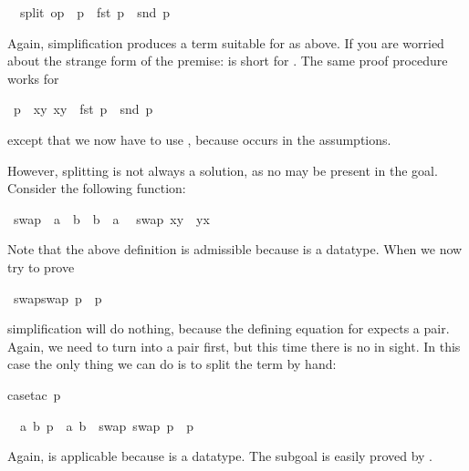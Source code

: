 \begin{isabellebody}
\begin{isamarkuptxt}
\begin{isabelle}%
\ {}{\isachardot}\ split\ op\ {\isacharequal}\ p\ {\isasymlongrightarrow}\ fst\ p\ {\isacharequal}\ snd\ p%
\end{isabelle}
Again, simplification produces a term suitable for 
as above. If you are worried about the strange form of the premise:
 is short for .
The same proof procedure works for%
\end{isamarkuptxt}%
\ {\isachardoublequote}p\ {\isasymin}\ {\isacharbraceleft}{\isacharparenleft}x{\isacharcomma}y{\isacharparenright}{\isachardot}\ x{\isacharequal}y{\isacharbraceright}\ {\isasymLongrightarrow}\ fst\ p\ {\isacharequal}\ snd\ p{\isachardoublequote}%
\begin{isamarkuptxt}%
\noindent
except that we now have to use , because
 occurs in the assumptions.

However, splitting  is not always a solution, as no 
may be present in the goal. Consider the following function:%
\end{isamarkuptxt}%
\ swap\ {\isacharcolon}{\isacharcolon}\ {\isachardoublequote}{\isacharprime}a\ {\isasymtimes}\ {\isacharprime}b\ {\isasymRightarrow}\ {\isacharprime}b\ {\isasymtimes}\ {\isacharprime}a{\isachardoublequote}\isanewline
{}\isanewline
\ \ {\isachardoublequote}swap\ {\isacharparenleft}x{\isacharcomma}y{\isacharparenright}\ {\isacharequal}\ {\isacharparenleft}y{\isacharcomma}x{\isacharparenright}{\isachardoublequote}%
\begin{isamarkuptext}%
\noindent
Note that the above  definition is admissible
because \isa{{\isasymtimes}} is a datatype. When we now try to prove%
\end{isamarkuptext}%
\ {\isachardoublequote}swap{\isacharparenleft}swap\ p{\isacharparenright}\ {\isacharequal}\ p{\isachardoublequote}%
\begin{isamarkuptxt}%
\noindent
simplification will do nothing, because the defining equation for 
expects a pair. Again, we need to turn  into a pair first, but this
time there is no  in sight. In this case the only thing we can do
is to split the term by hand:%
\end{isamarkuptxt}%
case{\isacharunderscore}tac\ p{\isacharparenright}%
\begin{isamarkuptxt}%
\noindent
\begin{isabelle}%
\ {}{\isachardot}\ {\isasymAnd}a\ b{\isachardot}\ p\ {\isacharequal}\ {\isacharparenleft}a{\isacharcomma}\ b{\isacharparenright}\ {\isasymLongrightarrow}\ swap\ {\isacharparenleft}swap\ p{\isacharparenright}\ {\isacharequal}\ p%
\end{isabelle}
Again,  is applicable because \isa{{\isasymtimes}} is a datatype.
The subgoal is easily proved by .


\end{isamarkuptxt}
\end{isabellebody}
